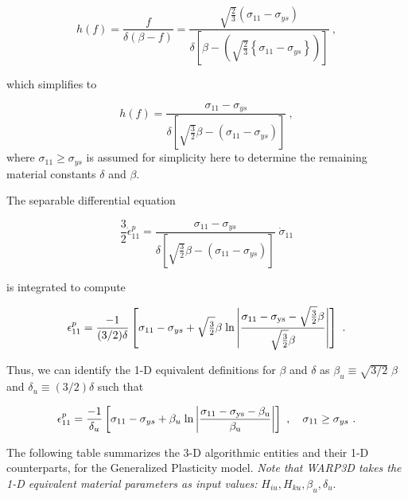 \documentclass[11pt]{report}
\numberwithin{equation}{section}
\begin{document}
\begin{equation}
h(f) = \frac{f}{\delta(\beta-f)} =  \frac{\sqrt{\frac{2}{3}}\left( \sigma_{11} - \sigma_{ys} \right)}
{\delta \left[ \beta - \left(\sqrt{\frac{2}{3}} \left\{\sigma_{11} - 
\sigma_{ys} \right\}\right) \right] }~,
\end{equation}

\noindent which simplifies to

\begin{equation}
h(f) = \frac{\sigma_{11}-\sigma_{ys}}
{\delta \left[\sqrt{\textstyle{\frac{3}{2}}}\beta-
(\sigma_{11}-\sigma_{ys})\right]}~,
\end{equation}
\noindent where $\sigma_{11}\ge \sigma_{ys}$ is assumed for simplicity here to determine
the remaining material constants $\delta$ and $\beta$.

The separable differential equation 

\begin{equation}
{\textstyle{\frac{3}{2}}} \dot\epsilon^p_{11} = 
 \frac{{\sigma_{11}}-\sigma_{ys}}
{\delta \left[\sqrt{\textstyle{\frac{3}{2}}}\beta-
(\sigma_{11}-\sigma_{ys})\right]}
\;\dot\sigma_{11}
\end{equation}

\noindent is  integrated to compute

\begin{equation}
\epsilon^p_{11}=\frac{-1}{(3/2)\delta}\left[\sigma_{11}-\sigma_{ys} + 
\sqrt{\textstyle{\frac{3}{2}}}\beta \;\rm{ln} \left| \frac{\sigma_{11}-\sigma_{ys}-
\sqrt{\textstyle{\frac{3}{2}}}\beta}{\sqrt{\textstyle{\frac{3}{2}}}\beta} \right| \right]~.
\end{equation}

\noindent Thus, we can identify the 1-D equivalent definitions 
for $\beta$ and $\delta$ as $\beta_u \equiv \sqrt{3/2}\;\beta$ and $\delta_u\equiv(3/2)\delta$ such that

\begin{equation}
\epsilon^p_{11}=\frac{-1}{\delta_u}\left[\sigma_{11}-\sigma_{ys} +
\beta_u \; \rm{ln} \left| \frac{\sigma_{11}-\sigma_{ys}-\beta_u}{\beta_u} \right| \right]~, 
\quad \sigma_{11} \ge \sigma_{ys}~.
\end{equation}

The following table summarizes the 3-D algorithmic entities and their 1-D counterparts, for 
the Generalized Plasticity model. \textit{Note that WARP3D takes the 1-D equivalent material 
parameters as input values:} $H_{iu}, H_{ku}, \beta_u, \delta_u$.
\end{document}
